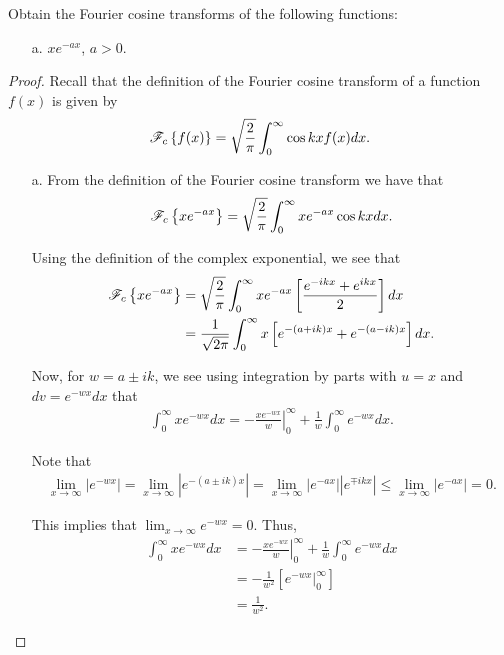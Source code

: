 \begin{problem}{2.14}
  Obtain the Fourier cosine transforms of the following functions:
  \begin{enumerate}
    \item[a.] $x e^{-a x}$, $a > 0$.
  \end{enumerate}
\end{problem}

\begin{proof}
  Recall that the definition of the Fourier cosine transform of a function $f(x)$
  is given by
  \begin{align*}
    \mathscr{F}_c\left\{ {f(x)} \right\} = \sqrt{\frac{2}{\pi}} \int_0^\infty \cos kx f(x) dx.
  \end{align*}
  \begin{enumerate}
    \item[a.] From the definition of the Fourier cosine transform we have that
      \begin{align*}
        \mathscr{F}_c\left\{ {xe^{-ax}} \right\} = \sqrt{\frac{2}{\pi}} \int_0^\infty x e^{-ax}\cos kx  dx.
      \end{align*}

      Using the definition of the complex exponential, we see that
      \begin{align*}
        \mathscr{F}_c\left\{ {xe^{-ax}} \right\}
        &= \sqrt{\frac{2}{\pi}} \int_0^\infty x e^{-ax}\left[\frac{e^{-ikx} + e^{ikx}}{2}\right]  dx \\
        &= \frac{1}{\sqrt{2\pi}} \int_0^\infty x \left[e^{-(a+ik)x} + e^{-(a-ik)x}\right]  dx.
      \end{align*}


      Now, for $w = a \pm ik$, we see using integration by parts with $u = x$ and $dv =e^{-wx}dx$ that
      \begin{align*}
        \int_{0}^\infty x e^{-wx}dx = \left.-\frac{xe^{-wx}}{w}\right\rvert_{0}^\infty + \frac{1}{w} \int_0^\infty e^{-wx} dx.
      \end{align*}

      Note that
      \begin{align*}
        \lim_{x\to\infty} \left| e^{-wx} \right| = \lim_{x\to\infty} \left|e^{-(a\pm ik)x}\right| = \lim_{x\to\infty} \left|e^{-ax}\right|  \left|e^{\mp ikx}\right| \leq \lim_{x\to\infty} \left|e^{-ax}\right|  = 0.
      \end{align*}

      This implies that $\lim_{x\to\infty} e^{-wx} = 0$. Thus,
      \begin{align*}
        \int_{0}^\infty x e^{-wx}dx &= \left.-\frac{xe^{-wx}}{w}\right\rvert_{0}^\infty + \frac{1}{w} \int_0^\infty e^{-wx} dx \\
        &=  -\frac{1}{w^2} \left[ \left.e^{-wx}\right\rvert_{0}^{\infty} \right] \\
        &= \frac{1}{w^2}.
      \end{align*}


\end{enumerate}
\end{proof}
